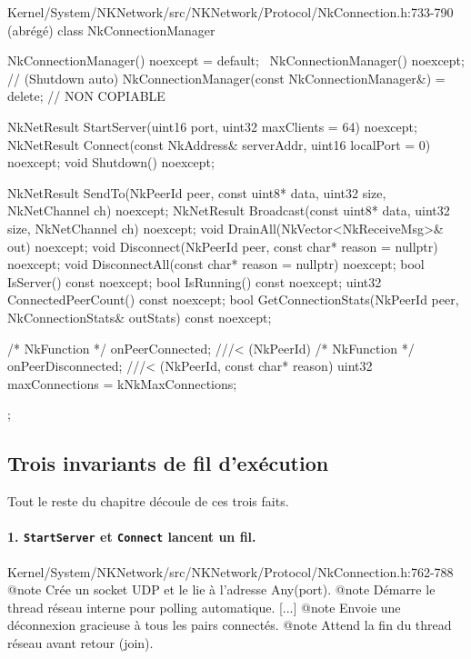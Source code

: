 \begin{nkcode}{Kernel/System/NKNetwork/src/NKNetwork/Protocol/NkConnection.h:733-790 (abrégé)}
class NkConnectionManager {
        NkConnectionManager() noexcept = default;
        ~NkConnectionManager() noexcept;                              // (Shutdown auto)
        NkConnectionManager(const NkConnectionManager&) = delete;     // NON COPIABLE

        NkNetResult StartServer(uint16 port, uint32 maxClients = 64) noexcept;
        NkNetResult Connect(const NkAddress& serverAddr, uint16 localPort = 0) noexcept;
        void Shutdown() noexcept;

        NkNetResult SendTo(NkPeerId peer, const uint8* data, uint32 size, NkNetChannel ch) noexcept;
        NkNetResult Broadcast(const uint8* data, uint32 size, NkNetChannel ch) noexcept;
        void DrainAll(NkVector<NkReceiveMsg>& out) noexcept;
        void Disconnect(NkPeerId peer, const char* reason = nullptr) noexcept;
        void DisconnectAll(const char* reason = nullptr) noexcept;
        bool IsServer() const noexcept;   bool IsRunning() const noexcept;
        uint32 ConnectedPeerCount() const noexcept;
        bool GetConnectionStats(NkPeerId peer, NkConnectionStats& outStats) const noexcept;

        /* NkFunction */ onPeerConnected;      ///< (NkPeerId)
        /* NkFunction */ onPeerDisconnected;   ///< (NkPeerId, const char* reason)
        uint32 maxConnections = kNkMaxConnections;
};
\end{nkcode}

\subsection{Trois invariants de fil d'exécution}

Tout le reste du chapitre découle de ces trois faits.

\paragraph{1. \texttt{StartServer} et \texttt{Connect} lancent un fil.}

\begin{nkcode}{Kernel/System/NKNetwork/src/NKNetwork/Protocol/NkConnection.h:762-788}
 @note Crée un socket UDP et le lie à l'adresse Any(port).
 @note Démarre le thread réseau interne pour polling automatique.
 [...]
 @note Envoie une déconnexion gracieuse à tous les pairs connectés.
 @note Attend la fin du thread réseau avant retour (join).
\end{nkcode}

